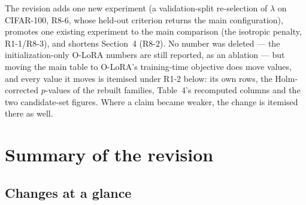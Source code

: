 The revision adds one new experiment (a validation-split re-selection of $\lambda$ on
CIFAR-100, R8-6, whose held-out criterion returns the main configuration), promotes one
existing experiment to the main comparison (the isotropic penalty, R1-1/R8-3), and shortens
Section~4 (R8-2). No number was deleted --- the initialization-only O-LoRA numbers are still
reported, as an ablation --- but moving the main table to O-LoRA's training-time objective
does move values, and every value it moves is itemised under R1-2 below: its own rows, the
Holm-corrected $p$-values of the rebuilt families, Table~4's recomputed columns and the two
candidate-set figures. Where a claim became weaker, the change is itemised there as well.

\section{Summary of the revision}

\subsection*{Changes at a glance}

